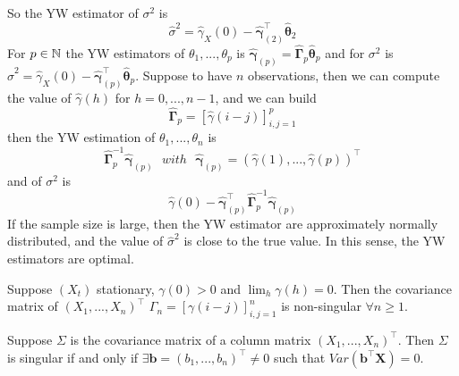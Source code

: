 So the YW estimator of $\sigma^2$ is
\[
    \hat{\sigma}^2=\hat{\gamma}_X(0)-\hat{\boldsymbol{\gamma}}_{(2)}^\intercal\hat{\boldsymbol{\theta}}_2 
\]
For $p\in\mathbb{N}$ the YW estimators of $\theta_1,...,\theta_p$ is $\hat{\boldsymbol{\gamma}}_{(p)}=\hat{\boldsymbol{\Gamma}}_p\hat{\boldsymbol{\theta}}_p$ and for $\sigma^2$ is $\hat{\sigma}^2=\hat{\gamma}_X(0)-\hat{\boldsymbol{\gamma}}_{(p)}^\intercal\hat{\boldsymbol{\theta}}_p$. Suppose to have $n$ observations, then we can compute the value of $\hat{\gamma}(h)$ for $h=0,...,n-1$, and we can build
\[
    \hat{\boldsymbol{\Gamma}}_p=\left[\hat{\gamma}(i-j)\right]_{i,j=1}^p  
\]
then the YW estimation of $\theta_1,...,\theta_n$ is
\[
    \hat{\boldsymbol{\Gamma}}_p^{-1}\hat{\boldsymbol{\gamma}}_{(p)}\ \ \ with\ \ \ \hat{\boldsymbol{\gamma}}_{(p)}=(\hat{\gamma}(1),...,\hat{\gamma}(p))^{\intercal}
\]
and of $\sigma^2$ is
\[
    \hat{\gamma}(0)-\hat{\boldsymbol{\gamma}}_{(p)}^\intercal\hat{\boldsymbol{\Gamma}}_p^{-1}\hat{\boldsymbol{\gamma}}_{(p)}
\]
If the sample size is large, then the YW estimator are approximately normally distributed, and the value of $\hat{\sigma}^2$ is close to the true value. In this sense, the YW estimators are optimal.

\begin{theorem}
    \label{theorem12}
    Suppose $(X_t)$ stationary, $\gamma(0)>0$ and $\lim_h\gamma(h)=0$. Then the covariance matrix of $(X_1,...,X_n)^\intercal$ $\Gamma_n=[\gamma(i-j)]_{i,j=1}^n$ is non-singular $\forall n\ge1$.
\end{theorem}

\begin{lemma}
    Suppose $\Sigma$ is the covariance matrix of a column matrix $(X_1,...,X_n)^\intercal$. Then $\Sigma$ is singular if and only if $\exists \boldsymbol{b}=(b_1,...,b_n)^\intercal\ne0$ such that $Var(\boldsymbol{b}^\intercal\boldsymbol{X})=0$.
\end{lemma}

